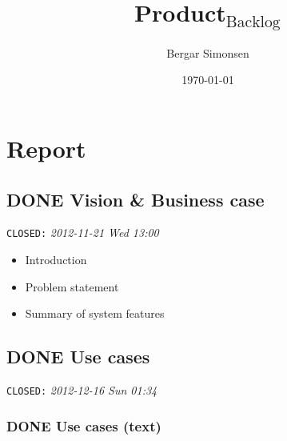 \documentclass[11pt]{article}
\title{Product$_{\mathrm{Backlog}}$}
\author{Bergar Simonsen}
\date{\today}
\begin{document}
\maketitle

\setcounter{tocdepth}{3}
\tableofcontents
\vspace*{1cm}
\section{Report}
\label{sec-1}
\subsection{\textbf{DONE} Vision \& Business case}
\label{sec-1-1}

   \texttt{CLOSED:} \textit{2012-11-21 Wed 13:00}

\begin{itemize}
\item Introduction
\item Problem statement
\item Summary of system features
\end{itemize}
\subsection{\textbf{DONE} Use cases}
\label{sec-1-2}

   \texttt{CLOSED:} \textit{2012-12-16 Sun 01:34}
\subsubsection{\textbf{DONE} Use cases (text)}
\label{sec-1-2-1}
\end{document}
